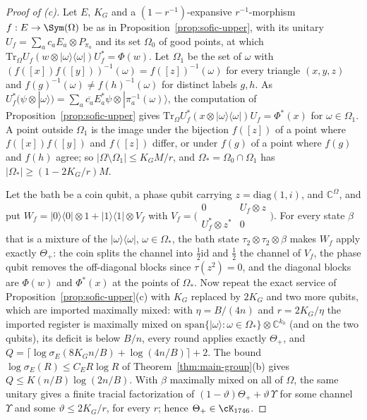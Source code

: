 \begin{proof}[Proof of (c)]
Let $E$, $K_G$ and a $(1-r^{-1})$-expansive $r^{-1}$-morphism $f:E\to\Sym(\Omega)$ be as in Proposition~\ref{prop:sofic-upper}, with its unitary
$U_f=\sum_ac_aE_a\otimes P_{\pi_a}$ and its set $\Omega_0$ of good points, at which $\mathrm{Tr}_\Omega U_f(w\otimes|\omega\rangle\langle\omega|)U_f^*=\Phi(w)$. Let
$\Omega_1$ be the set of $\omega$ with $(f([x])f([y]))^{-1}(\omega)=f([z])^{-1}(\omega)$ for every triangle $(x,y,z)$ and $f(g)^{-1}(\omega)\ne f(h)^{-1}(\omega)$ for
distinct labels $g,h$. As $U_f^*(\psi\otimes|\omega\rangle)=\sum_a\overline{c_a}E_a^*\psi\otimes|\pi_a^{-1}(\omega)\rangle$, the computation of
Proposition~\ref{prop:sofic-upper} gives $\mathrm{Tr}_\Omega U_f^*(x\otimes|\omega\rangle\langle\omega|)U_f=\Phi^*(x)$ for $\omega\in\Omega_1$. A point outside $\Omega_1$
is the image under the bijection $f([z])$ of a point where $f([x])f([y])$ and $f([z])$ differ, or under $f(g)$ of a point where $f(g)$ and $f(h)$
agree; so $|\Omega\setminus\Omega_1|\le K_GM/r$, and $\Omega_*=\Omega_0\cap\Omega_1$ has $|\Omega_*|\ge(1-2K_G/r)M$.

Let the bath be a coin qubit, a phase qubit carrying $z=\mathrm{diag}(1,i)$, and $\mathbb C^\Omega$, and put
$W_f=|0\rangle\langle0|\otimes1+|1\rangle\langle1|\otimes V_f$ with $V_f=\bigl(\begin{smallmatrix}0&U_f\otimes z\\U_f^*\otimes z^*&0\end{smallmatrix}\bigr)$. For every
state $\beta$ that is a mixture of the $|\omega\rangle\langle\omega|$, $\omega\in\Omega_*$, the bath state $\tau_2\otimes\tau_2\otimes\beta$ makes $W_f$ apply
exactly $\Theta_+$: the coin splits the channel into $\frac12\mathrm{id}$ and $\frac12$ the channel of $V_f$, the phase qubit removes the off-diagonal
blocks since $\tau(z^2)=0$, and the diagonal blocks are $\Phi(w)$ and $\Phi^*(x)$ at the points of $\Omega_*$. Now repeat the exact service of
Proposition~\ref{prop:sofic-upper}(c) with $K_G$ replaced by $2K_G$ and two more qubits, which are imported maximally mixed: with
$\eta=B/(4n)$ and $r=2K_G/\eta$ the imported register is maximally mixed on $\mathrm{span}\{|\omega\rangle:\omega\in\Omega_*\}\otimes\mathbb C^{k_0}$ (and on the
two qubits), its deficit is below $B/n$, every round applies exactly $\Theta_+$, and $Q=\lceil\log\sigma_E(8K_Gn/B)+\log(4n/B)\rceil+2$. The bound
$\log\sigma_E(R)\le C_ER\log R$ of Theorem~\ref{thm:main-group}(b) gives $Q\le K(n/B)\log(2n/B)$. With $\beta$ maximally mixed on all of $\Omega$,
the same unitary gives a finite tracial factorization of $(1-\vartheta)\Theta_++\vartheta\,\Upsilon$ for some channel $\Upsilon$ and some $\vartheta\le2K_G/r$, for every $r$; hence
$\Theta_+\in\cK_{1746}$.
\end{proof}

